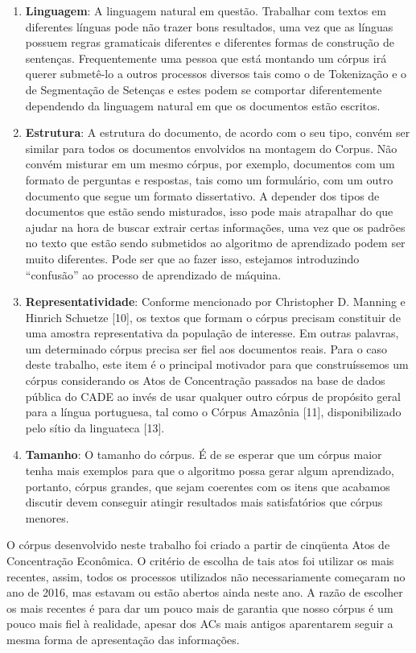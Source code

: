 \documentclass[11pt]{report}
\newcommand{\quotes}[1]{``#1''}
\begin{document}
\begin{enumerate}[label=\textbf{\arabic*.}]
  \item \textbf{Linguagem}: A linguagem natural em questão. Trabalhar com textos em diferentes línguas pode não trazer bons resultados, uma vez que as línguas possuem regras
  gramaticais diferentes e diferentes formas de construção de sentenças. Frequentemente uma pessoa que está montando um córpus irá querer submetê-lo a outros processos diversos
  tais como o de Tokenização e o de Segmentação de Setenças e estes podem se comportar diferentemente dependendo da linguagem natural em que os documentos estão escritos.
  \item \textbf{Estrutura}: A estrutura do documento, de acordo com o seu tipo, convém ser similar para todos os documentos envolvidos na montagem do Corpus. Não convém
  misturar em um mesmo córpus, por exemplo, documentos com um formato de perguntas e respostas, tais como um formulário, com um outro documento que segue um formato dissertativo.
  A depender dos tipos de documentos que estão sendo misturados, isso pode mais atrapalhar do que ajudar na hora de buscar extrair certas informações, uma vez que os padrões
  no texto que estão sendo submetidos ao algoritmo de aprendizado podem ser muito diferentes. Pode ser que ao fazer isso, estejamos introduzindo \quotes{confusão} ao processo
  de aprendizado de máquina.
  \item \textbf{Representatividade}: Conforme mencionado por Christopher D. Manning e Hinrich Schuetze [10], os textos que formam o córpus precisam constituir de uma amostra
  representativa da população de interesse. Em outras palavras, um determinado córpus precisa ser fiel aos documentos reais. Para o caso deste trabalho, este item é o principal
  motivador para que construíssemos um córpus considerando os Atos de Concentração passados na base de dados pública do CADE ao invés de usar qualquer outro córpus de propósito
  geral para a língua portuguesa, tal como o Córpus Amazônia [11], disponibilizado pelo sítio da linguateca [13].
  \item \textbf{Tamanho}: O tamanho do córpus. É de se esperar que um córpus maior tenha mais exemplos para que o algoritmo possa gerar algum aprendizado, portanto, córpus grandes,
  que sejam coerentes com os itens que acabamos discutir devem conseguir atingir resultados mais satisfatórios que córpus menores.
\end{enumerate}

O córpus desenvolvido neste trabalho foi criado a partir de cinqüenta Atos de Concentração Econômica. O critério de escolha de tais atos foi utilizar os mais recentes, assim,
todos os processos utilizados não necessariamente começaram no ano de 2016, mas estavam ou estão abertos ainda neste ano. A razão de escolher os mais recentes é para dar um pouco
mais de garantia que nosso córpus é um pouco mais fiel à realidade, apesar dos ACs mais antigos aparentarem seguir a mesma forma de apresentação das informações.
\end{document}

